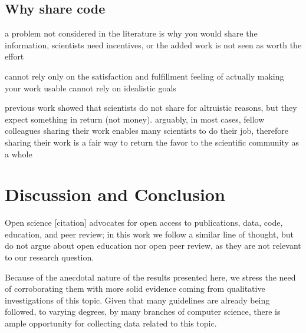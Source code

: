 \documentclass[12pt]{article}
\begin{document}
\subsection{Why share code}
\label{sec:org7d82978}
a problem not considered in the literature is why you would share the information, scientists need incentives, or the added work is not seen as worth the effort

cannot rely only on the satisfaction and fulfillment feeling of actually making your work usable
cannot rely on idealistic goals

previous work showed that scientists do not share for altruistic reasons, but they expect something in return (not money). arguably, in most cases, fellow colleagues sharing their work enables many scientists to do their job, therefore sharing their work is a fair way to return the favor to the scientific community as a whole


\section{Discussion and Conclusion}
\label{sec:org37b4415}
Open science [citation] advocates for open access to publications, data, code, education, and peer review; in this work we follow a similar line of thought, but do not argue about open education nor open peer review, as they are not relevant to our research question.

Because of the anecdotal nature of the results presented here, we stress the need of corroborating them with more solid evidence coming from qualitative investigations of this topic. Given that many guidelines are already being followed, to varying degrees, by many branches of computer science, there is ample opportunity for collecting data related to this topic.
\end{document}
